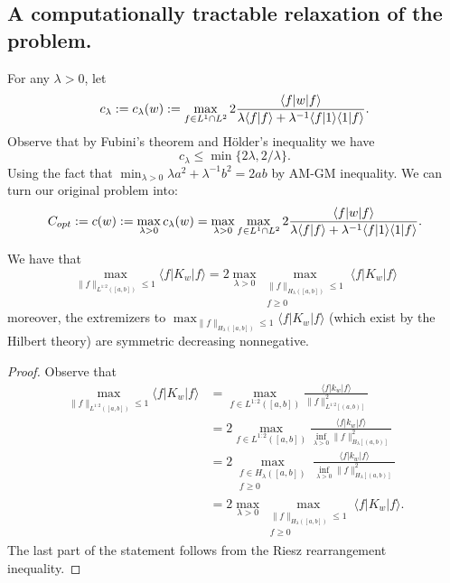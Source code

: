 \subsection*{A computationally tractable relaxation of the problem.} For any $\lambda>0$, let 
\begin{equation}\label{c lambda definition}
c_{\lambda}:=c_{\lambda}(w):=\max_{f \in L^1 \cap L^2}  2 \frac{\langle f | w | f \rangle}{\lambda  \langle f | f \rangle + \lambda^ {-1}\langle f | 1 \rangle \langle 1 | f \rangle}.
\end{equation}
Observe that by Fubini's theorem and H\"older's inequality we have
\begin{equation}\label{upper bounds for c lambda depending on lambda}
    c_{\lambda}\leq \min\{2\lambda,2/\lambda\}.
\end{equation}
Using the fact that $\min_{\lambda >0} \lambda a^2+\lambda^ {-1} b^2 = 2 ab$ by AM-GM inequality. We can turn our original problem into:
$$
C_{opt}:=c(w) :=\max_{\lambda>0}c_{\lambda}(w)= \max_{\lambda>0} \max_{f \in L^1 \cap L^2}  2 \frac{\langle f | w | f \rangle}{\lambda  \langle f | f \rangle + \lambda^ {-1}\langle f | 1 \rangle \langle 1 | f \rangle}. 
$$



\begin{lemma}\label{relation between norms in H lambda and L12}

We have that 
$$
\max_{\|f\|_{L^{1:2}([a,b])}\le 1} \langle f|K_w|f\rangle = 2\max_{\lambda>0} \max_{\substack{\|f\|_{H_\lambda ([a,b])}\le 1\\f\ge 0
             }
     }
\langle f|K_w|f\rangle
$$
moreover, the extremizers to $\max_{\|f\|_{H_\lambda ([a,b])}\le 1} \langle f|K_w|f\rangle$ (which exist by the Hilbert theory) are symmetric decreasing nonnegative.
\end{lemma}
\begin{proof}
Observe that
\begin{align*}
    \max_{\|f\|_{L^{1:2}([a,b])}\le 1} \langle f|K_w|f\rangle &=\max_{f\in L^{1:2}([a,b])} \frac{\langle f|k_w|f\rangle}{\|f\|^2_{L^{1:2}[(a,b)]}}  \\
    &= 2\max_{f\in L^{1:2}([a,b])} \frac{\langle f|k_w|f\rangle}{\inf_{\lambda>0}\|f\|^2_{B_{\lambda}[(a,b)]}}\\
    &= 2\max_{\substack{f\in {H_\lambda ([a,b])}\\f\ge 0}} \frac{\langle f|k_w|f\rangle}{\inf_{\lambda>0}\|f\|^2_{H_{\lambda}[(a,b)]}}\\
    &=2\max_{\lambda>0} \max_{\substack{\|f\|_{H_\lambda ([a,b])}\le 1\\f\ge 0}}
\langle f|K_w|f\rangle.
\end{align*}
The last part of the statement follows from the Riesz rearrangement inequality.
\end{proof}

